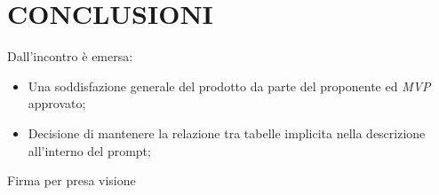 \documentclass[5pt]{article}
\begin{document}
\section{CONCLUSIONI}
Dall'incontro è emersa: 
\begin{itemize}
    \item Una soddisfazione generale del prodotto da parte del proponente ed \textit{MVP} approvato;
    \item Decisione di mantenere la relazione tra tabelle implicita nella descrizione all'interno del prompt;
\end{itemize}

\vspace{3em}
\begin{flushright}
	\begin{spacing}{1.5}
		Firma per presa visione\\
	\end{spacing}
\end{flushright}
\end{document}
